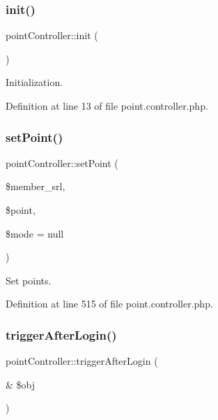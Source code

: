\subsubsection{\texorpdfstring{init()}{init()}}
{\footnotesize\ttfamily point\+Controller\+::init (\begin{DoxyParamCaption}{ }\end{DoxyParamCaption})}



Initialization. 



Definition at line 13 of file point.\+controller.\+php.

\mbox{\label{classpointController_a1d45833bcf85677a723269af3e13c675}} 
\subsubsection{\texorpdfstring{set\+Point()}{setPoint()}}
{\footnotesize\ttfamily point\+Controller\+::set\+Point (\begin{DoxyParamCaption}\item[{}]{\$member\+\_\+srl,  }\item[{}]{\$point,  }\item[{}]{\$mode = {\ttfamily null} }\end{DoxyParamCaption})}



Set points. 



Definition at line 515 of file point.\+controller.\+php.

\mbox{\label{classpointController_aa0a463b222d4980e729e27e104e11f43}} 
\subsubsection{\texorpdfstring{trigger\+After\+Login()}{triggerAfterLogin()}}
{\footnotesize\ttfamily point\+Controller\+::trigger\+After\+Login (\begin{DoxyParamCaption}\item[{\&}]{\$obj }\end{DoxyParamCaption})}



